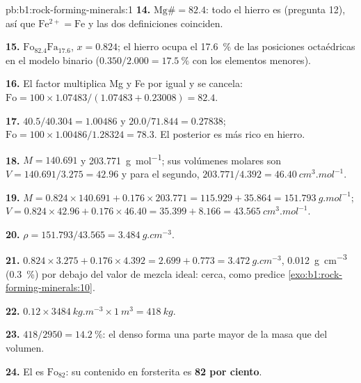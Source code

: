 \begin{solution}{pb:b1:rock-forming-minerals:1}
\textbf{14.} $\mathrm{Mg\#} = 82.4$: todo el hierro es  (pregunta 12), así que
$\mathrm{Fe^{2+}} = \mathrm{Fe}$ y las dos definiciones coinciden.

\textbf{15.} $\text{Fo}_{82.4}\text{Fa}_{17.6}$, $x = 0.824$; el hierro ocupa el
\qty{17.6}{\percent} de las posiciones octaédricas en el modelo binario
($0.350/2.000 = \qty{17.5}{\percent}$ con los elementos menores).

\textbf{16.} El factor multiplica Mg y Fe por igual y se cancela:
$\mathrm{Fo} = 100\times1.07483/(1.07483 + 0.23008) = 82.4$.

\textbf{17.} $40.5/40.304 = 1.00486$ y $20.0/71.844 = 0.27838$;
$\mathrm{Fo} = 100\times1.00486/1.28324 = 78.3$. El  posterior es más rico en hierro.

\textbf{18.} $M = 140.691$ y \qty{203.771}{g.mol^{-1}}; sus volúmenes molares son
$V = 140.691/3.275 = 42.96$ y para el segundo, $203.771/4.392 =
\qty{46.40}{cm^3.mol^{-1}}$.

\textbf{19.} $M = 0.824\times140.691 + 0.176\times203.771 = 115.929 +
35.864 = \qty{151.793}{g.mol^{-1}}$; $V = 0.824\times42.96 +
0.176\times46.40 = 35.399 + 8.166 = \qty{43.565}{cm^3.mol^{-1}}$.

\textbf{20.} $\rho = 151.793/43.565 = \qty{3.484}{g.cm^{-3}}$.

\textbf{21.} $0.824\times3.275 + 0.176\times4.392 = 2.699 + 0.773 =
\qty{3.472}{g.cm^{-3}}$, \qty{0.012}{g.cm^{-3}} (\qty{0.3}{\percent}) por debajo del valor de mezcla ideal:
cerca, como predice \cref{exo:b1:rock-forming-minerals:10}.

\textbf{22.} $0.12\times\qty{3484}{kg.m^{-3}}\times\qty{1}{m^3} =
\qty{418}{kg}$.

\textbf{23.} $418/2950 = \qty{14.2}{\percent}$: el  denso forma una parte mayor de la masa que del
volumen.

\textbf{24.} El  es $\text{Fo}_{82}$: su contenido en forsterita es
\textbf{82 por ciento}.
\end{solution}
